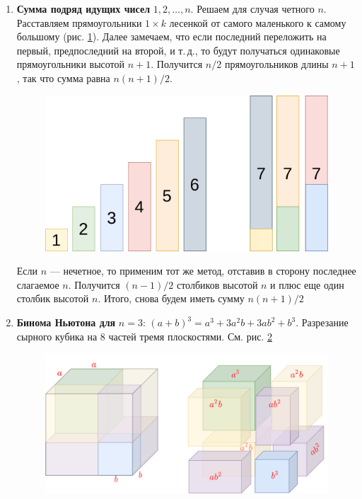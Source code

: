 \begin{enumerate}
\item \textbf{Сумма подряд идущих чисел} $1,2,\dots,n$. Решаем для случая четного $n$.
Расставляем прямоугольники $1\times k$ лесенкой от самого маленького к самому большому (рис. \ref{ariphm}). Далее замечаем, что если последний переложить на первый, предпоследний на второй, и т.\,д., то будут получаться одинаковые прямоугольники высотой $n+1$. Получится $n/2$ прямоугольников длины $n+1$, так что сумма равна $n(n+1)/2$.

\begin{figure}[hbt!]
\begin{center}
\includegraphics[scale=0.2]{ariphm.png}
\end{center}
\caption{}\label{ariphm}
\end{figure}

Если $n$ --- нечетное, то применим тот же метод, отставив в сторону последнее слагаемое $n$. Получится $(n-1)/2$ столбиков высотой $n$ и плюс еще один столбик высотой $n$. Итого, снова будем иметь сумму $n(n+1)/2$

\item \textbf{Бинома Ньютона для} $n=3$: $(a+b)^3 = a^3+3a^2b+3ab^2+b^3$. Разрезание сырного кубика на 8 частей тремя плоскостями. См. рис. \ref{kub}

\begin{figure}[hbt!]
\begin{center}
\includegraphics[scale=0.25]{kub.png}
\end{center}
\caption{}\label{kub}
\end{figure}
\end{enumerate}


